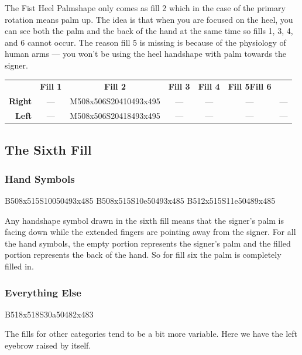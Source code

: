 \documentclass{article}
\begin{document}
The Fist Heel Palmshape only comes as fill 2 which in the case of the primary rotation means palm up.
The idea is that when you are focused on the heel, you can see both the palm and the back of the hand at the same time so fills 1, 3, 4, and 6 cannot occur.
The reason fill 5 is missing is because of the physiology of human arms --- you won't be using the heel handshape with palm towards the signer.

\begin{center}
\begin{tabular}{r*{6}{c}}
&\textbf{Fill 1}&\textbf{Fill 2}&\textbf{Fill 3}&\textbf{Fill 4}&\textbf{Fill 5}\textbf{Fill 6}\\
\textbf{Right}&---&M508x506S20410493x495&---&---&---&---\\
\textbf{Left} &---&M508x506S20418493x495&---&---&---&---\\
\end{tabular}
\end{center}

\subsection{The Sixth Fill}

\subsubsection{Hand Symbols}

\begin{center}
B508x515S10050493x485 B508x515S10e50493x485 B512x515S11e50489x485
\end{center}

Any handshape symbol drawn in the sixth fill means that the signer's palm is facing down while the extended fingers are pointing away from the signer.
For all the hand symbols, the empty portion represents the signer's palm and the filled portion represents the back of the hand.
So for fill six the palm is completely filled in.

\subsubsection{Everything Else}

\begin{center}
B518x518S30a50482x483
\end{center}

The fills for other categories tend to be a bit more variable.
Here we have the left eyebrow raised by itself.
\end{document}
